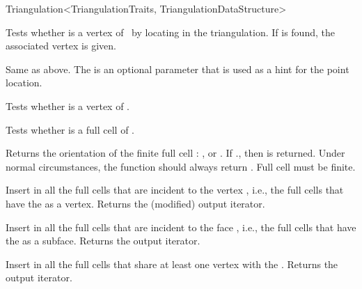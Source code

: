 \begin{ccRefClass}{Triangulation<TriangulationTraits, TriangulationDataStructure>}



 {Tests
whether  is a vertex of \ccVar\ by locating  in the triangulation.  If
 is found, the associated vertex  is given.}

\ccGlue{} {Same as above.  The  is
an optional parameter that is used as a hint for the point location.}

\ccGlue{}
{Tests whether  is a vertex of \ccVar.}

{Tests whether  is a full cell of \ccVar.}

{Returns the orientation of the finite full cell :
\ccGlobalScope{}, \ccGlobalScope{} or
\ccGlobalScope{}. If \ccVar., then
\ccGlobalScope{} is returned. Under normal circumstances, the function
should always return \ccGlobalScope{}.
\ccPrecond Full cell  must be finite.
}

{Insert in  all the full cells that are incident to the vertex
, {i.e.}, the full cells that have the  as a vertex.
Returns the (modified) output iterator.
}

{Insert in  all the full cells that are incident to the face ,
{i.e.}, the full cells that have the  as a subface.
Returns the output iterator.
}

{Insert in  all the full cells that share at least one vertex with the . Returns the output iterator.
}


\end{ccRefClass}
